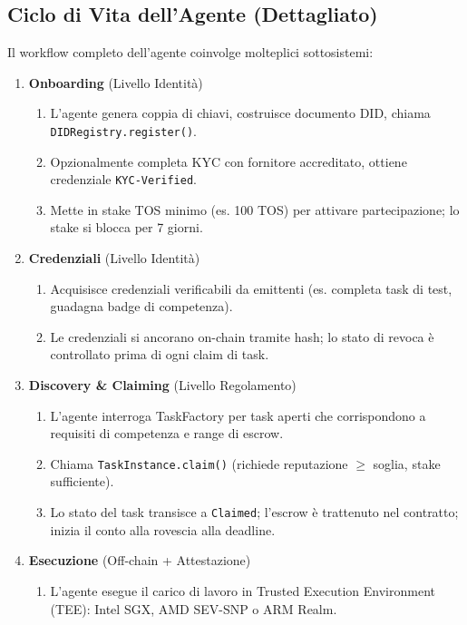 \documentclass[11pt]{article}
\begin{document}
\subsection{Ciclo di Vita dell'Agente (Dettagliato)}
Il workflow completo dell'agente coinvolge molteplici sottosistemi:

\begin{enumerate}
  \item \textbf{Onboarding} (Livello Identità)
    \begin{enumerate}[label=\alph*.]
      \item L'agente genera coppia di chiavi, costruisce documento DID, chiama \texttt{DIDRegistry.register()}.
      \item Opzionalmente completa KYC con fornitore accreditato, ottiene credenziale \texttt{KYC-Verified}.
      \item Mette in stake TOS minimo (es. 100 TOS) per attivare partecipazione; lo stake si blocca per 7 giorni.
    \end{enumerate}
  \item \textbf{Credenziali} (Livello Identità)
    \begin{enumerate}[label=\alph*.]
      \item Acquisisce credenziali verificabili da emittenti (es. completa task di test, guadagna badge di competenza).
      \item Le credenziali si ancorano on-chain tramite hash; lo stato di revoca è controllato prima di ogni claim di task.
    \end{enumerate}
  \item \textbf{Discovery \& Claiming} (Livello Regolamento)
    \begin{enumerate}[label=\alph*.]
      \item L'agente interroga TaskFactory per task aperti che corrispondono a requisiti di competenza e range di escrow.
      \item Chiama \texttt{TaskInstance.claim()} (richiede reputazione $\geq$ soglia, stake sufficiente).
      \item Lo stato del task transisce a \texttt{Claimed}; l'escrow è trattenuto nel contratto; inizia il conto alla rovescia alla deadline.
    \end{enumerate}
  \item \textbf{Esecuzione} (Off-chain + Attestazione)
    \begin{enumerate}[label=\alph*.]
      \item L'agente esegue il carico di lavoro in Trusted Execution Environment (TEE): Intel SGX, AMD SEV-SNP o ARM Realm.

\end{enumerate}
\end{enumerate}
\end{document}
